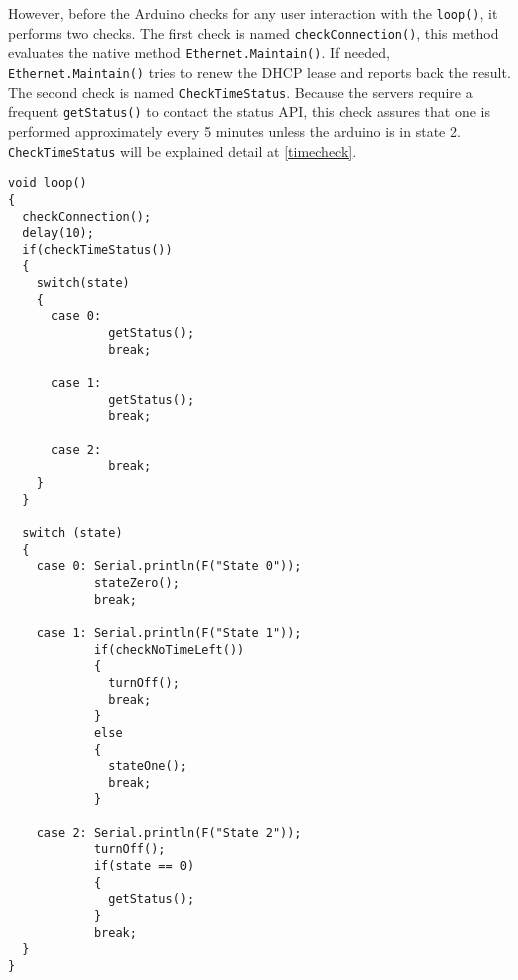 However, before the Arduino checks for any user interaction with the \verb|loop()|, it performs two checks.
The first check is named \verb|checkConnection()|, this method evaluates the native method \verb|Ethernet.Maintain()|.
If needed, \verb|Ethernet.Maintain()| tries to renew the DHCP lease and reports back the result.\newline
The second check is named \verb|CheckTimeStatus|. Because the servers require a frequent \verb|getStatus()| to contact the status API, this check assures that one is performed approximately every 5 minutes unless the arduino is in state 2.
\verb|CheckTimeStatus| will be explained detail at \autoref{timecheck}.

\begin{lstlisting}[frame=single, label=loopy, caption=The Arduino loop.]
void loop()
{  
  checkConnection();
  delay(10);
  if(checkTimeStatus())
  {
    switch(state)
    {
      case 0: 
              getStatus();
              break;
              
      case 1: 
              getStatus();
              break;
             
      case 2: 
              break;           
    }
  }
    
  switch (state)
  {
    case 0: Serial.println(F("State 0"));
            stateZero();
            break;
            
    case 1: Serial.println(F("State 1"));
            if(checkNoTimeLeft())
            {
              turnOff();
              break;
            }
            else
            {
              stateOne();
              break;
            }
            
    case 2: Serial.println(F("State 2"));
            turnOff();
            if(state == 0)
            {
              getStatus();
            }
            break;             
  }
}
\end{lstlisting}

